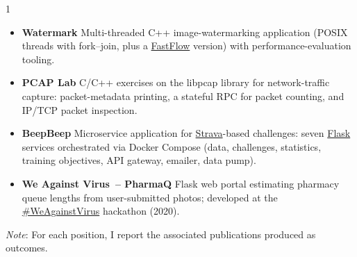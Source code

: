 \documentclass[10pt,a4paper,ragged2e,academicons]{altacv}
\newif\ifshortcv
\begin{document}
\begin{paracol}{1}
{\small
\begin{itemize}[leftmargin=1.3em, itemsep=3pt, topsep=1pt, parsep=0pt]
  \item \textbf{Watermark} \href{https://github.com/ftosoni/Watermark}{\faGithub}\enspace Multi-threaded C++ image-watermarking application (POSIX threads with fork--join, plus a \href{https://github.com/fastflow/fastflow}{FastFlow} version) with performance-evaluation tooling.
  \item \textbf{PCAP Lab} \href{https://github.com/ftosoni/PCAPLab}{\faGithub}\enspace C/C++ exercises on the libpcap library for network-traffic capture: packet-metadata printing, a stateful RPC for packet counting, and IP/TCP packet inspection.
  \item \textbf{BeepBeep} \href{https://github.com/MFranceschi6/BeepBeep-composer}{\faGithub}\enspace Microservice application for \href{https://www.strava.com}{Strava}-based challenges: seven \href{https://flask.palletsprojects.com/en/stable/}{Flask} services orchestrated via Docker Compose (data, challenges, statistics, training objectives, API gateway, emailer, data pump).
  \item \textbf{We Against Virus~-- PharmaQ} \href{https://github.com/DanyEle/WeAgainstVirus-FTD}{\faGithub}\enspace Flask web portal estimating pharmacy queue lengths from user-submitted photos; developed at the \href{https://hackthealps.it/weagainstvirus}{\#WeAgainstVirus} hackathon (2020).
\end{itemize}
}

\fi%

\smallskip

{\em Note}: For each position, I report the associated publications produced as outcomes.

\divider

\end{paracol}
\end{document}
